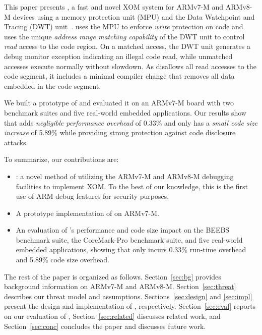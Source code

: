 This paper presents \emph{\System}, a fast and novel XOM
system for ARMv7-M and ARMv8-M devices using a memory protection unit
(MPU) and the Data Watchpoint and Tracing (DWT)
unit~\cite{ARMv7-M:Manual,ARMv8-M:Manual}.  {\System} uses the MPU to enforce
\emph{write} protection on code and uses the
unique \emph{address range matching capability}
of the DWT unit to control \emph{read} access to the code region.  On a
matched access, the DWT unit generates a debug monitor exception
indicating an illegal code read, while unmatched accesses execute
normally without slowdown. As {\System} disallows all read
accesses to the code segment, it includes a minimal compiler change that
removes all data embedded in the code segment.

We built a prototype of {\System} and
evaluated it on an ARMv7-M board with two benchmark suites and five
real-world embedded applications.  Our results show that {\System} adds
\emph{negligible performance overhead} of 0.33\% and only has a
\emph{small code size
increase} of 5.89\% while providing strong protection against code disclosure
attacks.

To summarize, our contributions are:
\begin{itemize}
\item
  {\System}: a novel method of utilizing the ARMv7-M and ARMv8-M
  debugging facilities to implement XOM.
  To the best of our knowledge, this is the first use of ARM debug
  features for security purposes.

\item
  A prototype implementation of {\System} on ARMv7-M.

\item
  An evaluation of {\System}'s performance and code size impact on the
  BEEBS benchmark suite, the CoreMark-Pro benchmark suite, and five
  real-world embedded applications, showing that {\System} only incurs 0.33\%
  run-time overhead and 5.89\% code size overhead.
\end{itemize}

The rest of the paper is organized as follows.  Section~\ref{sec:bg}
provides background information on ARMv7-M and ARMv8-M.
Section~\ref{sec:threat} describes our threat model and assumptions.
Sections~\ref{sec:design} and \ref{sec:impl} present the design and
implementation of {\System}, respectively.  Section~\ref{sec:eval}
reports on our evaluation of {\System}, Section~\ref{sec:related}
discusses related work, and Section~\ref{sec:conc} concludes the paper
and discusses future work.
